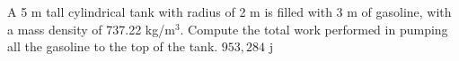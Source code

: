 {A 5 m tall cylindrical tank with radius of 2 m is filled with 3 m of gasoline, with a mass density of 737.22 kg/m$^3$. Compute the total work performed in pumping all the gasoline to the top of the tank. 
}
{$953,284$ j}
